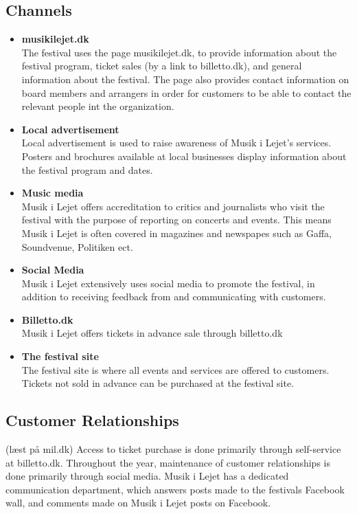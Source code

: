 \subsection{Channels} %
\label{sub:channels}
\begin{itemize}
(baseret dels på møde med kristian og stakke, dels på at observere facebeek og mil.dk)
	\item \textbf{musikilejet.dk}\\
		The festival uses the page musikilejet.dk, to provide information about the festival program, ticket sales (by a link to billetto.dk), and general information about the festival. The page also provides contact information on board members and arrangers in order for customers to be able to contact the relevant people int the organization.
	\item \textbf{Local advertisement}\\
		Local advertisement is used to raise awareness of Musik i Lejet's services. Posters and brochures available at local businesses display information about the festival program and dates.
	\item \textbf{Music media}\\
		Musik i Lejet offers accreditation to critics and journalists who visit the festival with the purpose of reporting on concerts and events. This means Musik i Lejet is often covered in magazines and newspapes such as Gaffa, Soundvenue, Politiken ect.
	\item \textbf{Social Media}\\
		Musik i Lejet extensively uses social media to promote the festival, in addition to receiving feedback from and communicating with customers.
	\item \textbf{Billetto.dk}\\
		Musik i Lejet offers tickets in advance sale through billetto.dk
	\item \textbf{The festival site}\\
		The festival site is where all events and services are offered to customers. Tickets not sold in advance can be purchased at the festival site.
\end{itemize}
\subsection{Customer Relationships} %
\label{sub:customer_relationships}
(læst på mil.dk)
Access to ticket purchase is done primarily through self-service at billetto.dk. Throughout the year, maintenance of customer relationships is done primarily through social media. Musik i Lejet has a dedicated communication department, which answers posts made to the festivals Facebook wall, and comments made on Musik i Lejet posts on Facebook.

